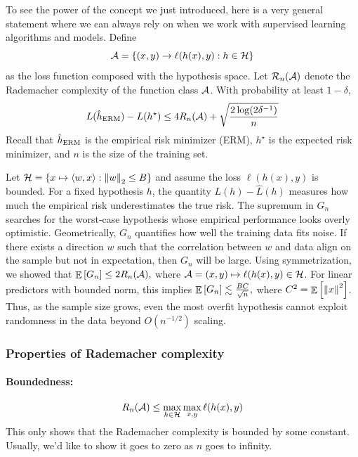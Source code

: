 To see the power of the concept we just introduced, here is a very general statement where we can always rely on when we work with supervised learning algorithms and models.
Define \[ \mathcal{A} = \left\{(x, y) \rightarrow \ell(h(x), y) : h \in \mathcal{H}\right\}\] as the loss function composed with the hypothesis space.
Let $\mathcal{R}_n(\mathcal{A})$ denote the Rademacher complexity of the function class $\mathcal{A}$.
With probability at least $1 - \delta$,
\begin{align} L(\hat h_{\textup{ERM}}) - L(h^{\star}) \le 4 R_n(\mathcal{A}) + \sqrt{\frac {2\log(2\delta^{-1})} n} \label{eq_rade_bound}\end{align}
Recall that $\hat h_{\textup{ERM}}$ is the empirical risk minimizer (ERM), $h^{\star}$ is the expected risk minimizer, and $n$ is the size of the training set.


\begin{example}
    Let $\mathcal{H} = \left\{ x \mapsto \langle w, x \rangle : \left\| w \right\|_2 \le B \right\}$ and assume the loss $\ell(h(x),y)$ is bounded.
    For a fixed hypothesis $h$, the quantity $L(h)-\hat L(h)$ measures how much the empirical risk underestimates the true risk.
    The supremum in $G_n$ searches for the {worst-case hypothesis} whose empirical performance looks overly optimistic.
    Geometrically, $G_n$ quantifies how well the training data fits noise. If there exists a direction $w$ such that the correlation between $w$ and data align on the sample but not in expectation, then $G_n$ will be large.
    Using symmetrization, we showed that $\mathop{\mathbb{E}}\left[ G_n \right] \le 2 R_n(\mathcal{A}),$ where $\mathcal{A}={(x,y)\mapsto \ell(h(x),y)\in\mathcal{H}}$.
    For linear predictors with bounded norm, this implies $\mathop{\mathbb{E}}\left[ G_n \right] \lesssim \frac{B C}{\sqrt n},$ where $C^2=\mathop{\mathbb{E}}\left[ \left\| x \right\|^2 \right]$.
    Thus, as the sample size grows, even the most overfit hypothesis cannot exploit randomness in the data beyond $O(n^{-1/2})$ scaling.
\end{example}

\subsubsection{Properties of Rademacher complexity}\label{sec_property_rade}

\paragraph{Boundedness:}
\begin{align*}
    R_n(\mathcal{A}) \le \max_{h\in \mathcal{H}} \max_{x, y} \ell(h(x), y)
\end{align*}
This only shows that the Rademacher complexity is bounded by some constant. Usually, we'd like to show it goes to zero as $n$ goes to infinity.

